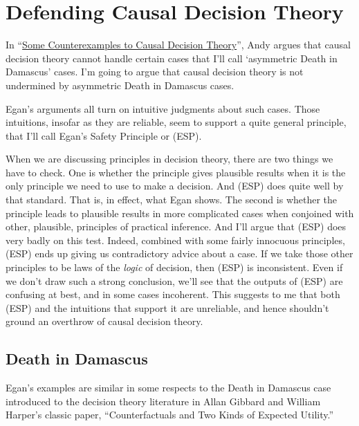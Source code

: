 \chapter{Defending Causal Decision Theory}

\unpub{}

\noindent In ``\href{http://www.geocities.com/eganamit/NoCDT.pdf }{Some Counterexamples to Causal Decision Theory}'', Andy \citeauthor{Egan2007-EGASCT} argues that causal decision theory cannot handle certain cases that I'll call `asymmetric Death in Damascus' cases. I'm going to argue that causal decision theory is not undermined by asymmetric Death in Damascus cases. 

Egan's arguments all turn on intuitive judgments about such cases. Those intuitions, insofar as they are reliable, seem to support a quite general principle, that I'll call Egan's Safety Principle or (ESP).

When we are discussing principles in decision theory, there are two things we have to check. One is whether the principle gives plausible results when it is the only principle we need to use to make a decision. And (ESP) does quite well by that standard. That is, in effect, what Egan shows. The second is whether the principle leads to plausible results in more complicated cases when conjoined with other, plausible, principles of practical inference. And I'll argue that (ESP) does very badly on this test. Indeed, combined with some fairly innocuous principles, (ESP) ends up giving us contradictory advice about a case. If we take those other principles to be laws of the \textit{logic} of decision, then (ESP) is inconsistent. Even if we don't draw such a strong conclusion, we'll see that the outputs of (ESP) are confusing at best, and in some cases incoherent. This suggests to me that both (ESP) and the intuitions that support it are unreliable, and hence shouldn't ground an overthrow of causal decision theory.

\section{Death in Damascus}
Egan's examples are similar in some respects to the Death in Damascus case introduced to the decision theory literature in Allan Gibbard and William Harper's classic paper, ``Counterfactuals and Two Kinds of Expected Utility.'' \citep[157-158]{GibbardHarper1978}

